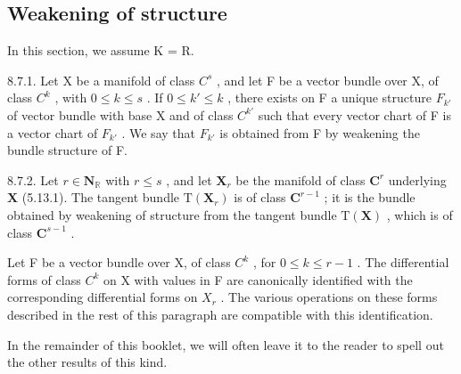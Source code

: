 \subsection{Weakening of structure}

In this section, we assume K = R.

8.7.1. Let X be a manifold of class \(C^{s}\) , and let F be a vector bundle over X, of class \(C^{k}\) , with \(0 \leqslant k \leqslant s\) . If \(0 \leqslant k' \leqslant k\) , there exists on F a unique structure \(F_{k'}\) of vector bundle with base X and of class \(C^{k'}\) such that every vector chart of F is a vector chart of \(F_{k'}\) . We say that \(F_{k'}\) is obtained from F by weakening the bundle structure of F.

8.7.2. Let \(r \in \mathbf{N}_{\mathbb{R}}\) with \(r \leqslant s\) , and let \(\mathbf{X}_r\) be the manifold of class \(\mathbf{C}^r\) underlying \(\mathbf{X}\) (5.13.1). The tangent bundle \(\mathrm{T}(\mathbf{X}_r)\) is of class \(\mathbf{C}^{r-1}\) ; it is the bundle obtained by weakening of structure from the tangent bundle \(\mathrm{T}(\mathbf{X})\) , which is of class \(\mathbf{C}^{s-1}\) .

Let F be a vector bundle over X, of class \(C^{k}\) , for \(0 \leqslant k \leqslant r - 1\) . The differential forms of class \(C^{k}\) on X with values in F are canonically identified with the corresponding differential forms on \(X_{r}\) . The various operations on these forms described in the rest of this paragraph are compatible with this identification.

In the remainder of this booklet, we will often leave it to the reader to spell out the other results of this kind.

